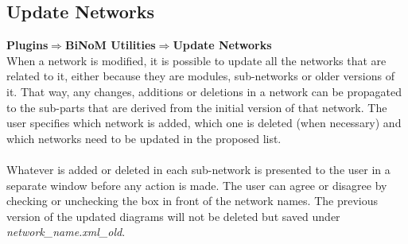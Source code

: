 \subsection{Update Networks}
\textbf{Plugins$\Rightarrow$BiNoM Utilities$\Rightarrow$Update Networks}\\
When a network is modified, it is possible to update all the networks that are related to it, either because they are modules, sub-networks or older versions of it. That way, any changes, additions or deletions in a network can be propagated to the sub-parts that are derived from the initial version of that network. The user specifies which network is added, which one is deleted (when necessary) and which networks need to be updated in the proposed list.\\\\
Whatever is added or deleted in each sub-network is presented to the user in a separate window before any action is made. The user can agree or disagree by checking or unchecking the box in front of the network names. The previous version of the updated diagrams will not be deleted but saved under \textit{network\_name.xml\_old}. 

